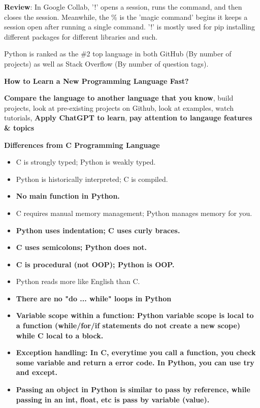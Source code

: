 {\textbf{Review}: In Google Collab, '!' opens a session, runs the command, and then closes the session. Meanwhile, the \% is the 'magic command' begins it keeps a session open after running a single command. '!' is mostly used for pip installing different packages for different libraries and such.

Python is ranked as the \#2 top language in both GitHub (By number of projects) as well as Stack Overflow (By number of question tags).

\vspace{11pt}
\textbf{How to Learn a New Programming Language Fast?}
\vspace{11pt}

\textbf{Compare the language to another language that you know}, build projects, look at pre-existing projects on Github, look at examples, watch tutorials, \textbf{Apply ChatGPT to learn}, \textbf{pay attention to langauge features \& topics}

\vspace{11pt}
\textbf{Differences from C Programming Language}
\vspace{11pt}

\begin{itemize}
  \item C is strongly typed; Python is weakly typed.
  \item Python is historically interpreted; C is compiled.
  \item \textbf{No main function in Python.}
  \item C requires manual memory management; Python manages memory for you.
  \item \textbf{Python uses indentation; C uses curly braces.}
  \item \textbf{C uses semicolons; Python does not.}
  \item \textbf{C is procedural (not OOP); Python is OOP.}
  \item Python reads more like English than C.
  \item \textbf{There are no "do ... while" loops in Python}
  \item \textbf{Variable scope within a function: Python variable scope is local to a function (while/for/if statements do not create a new scope) while C local to a block.}
  \item \textbf{Exception handling: In C, everytime you call a function, you check some variable and return a error code. In Python, you can use try and except.}
  \item \textbf{Passing an object in Python is similar to pass by reference, while passing in an int, float, etc is pass by variable (value).}
\end{itemize}

}
